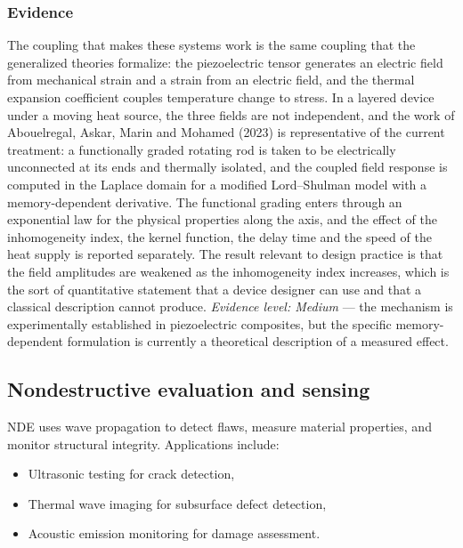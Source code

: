 \subsubsection{Evidence}
The coupling that makes these systems work is the same coupling that the generalized theories formalize: the piezoelectric tensor generates an electric field from mechanical strain and a strain from an electric field, and the thermal expansion coefficient couples temperature change to stress. In a layered device under a moving heat source, the three fields are not independent, and the work of Abouelregal, Askar, Marin and Mohamed (2023) \cite{Abouelregal2023} is representative of the current treatment: a functionally graded rotating rod is taken to be electrically unconnected at its ends and thermally isolated, and the coupled field response is computed in the Laplace domain for a modified Lord--Shulman model with a memory-dependent derivative. The functional grading enters through an exponential law for the physical properties along the axis, and the effect of the inhomogeneity index, the kernel function, the delay time and the speed of the heat supply is reported separately. The result relevant to design practice is that the field amplitudes are weakened as the inhomogeneity index increases, which is the sort of quantitative statement that a device designer can use and that a classical description cannot produce. \emph{Evidence level: Medium} --- the mechanism is experimentally established in piezoelectric composites, but the specific memory-dependent formulation is currently a theoretical description of a measured effect.

\subsection{Nondestructive evaluation and sensing}
\label{sec:13.2}

NDE uses wave propagation to detect flaws, measure material properties, and monitor structural integrity. Applications include:
\begin{itemize}
\item Ultrasonic testing for crack detection,
\item Thermal wave imaging for subsurface defect detection,
\item Acoustic emission monitoring for damage assessment.
\end{itemize}

